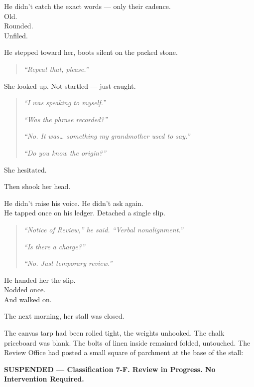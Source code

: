 \documentclass[12pt]{article}
\begin{document}
He didn’t catch the exact words --- only their cadence.\\
Old.\\
Rounded.\\
Unfiled.

\vspace{1em}

He stepped toward her, boots silent on the packed stone.

\begin{quote}
\textit{“Repeat that, please.”}
\end{quote}

She looked up. Not startled --- just caught.

\begin{quote}
\textit{“I was speaking to myself.”}

\textit{“Was the phrase recorded?”}

\textit{“No. It was… something my grandmother used to say.”}

\textit{“Do you know the origin?”}
\end{quote}

She hesitated.

Then shook her head.

He didn’t raise his voice. He didn’t ask again.\\
He tapped once on his ledger. Detached a single slip.

\begin{quote}
\textit{“Notice of Review,” he said. “Verbal nonalignment.”}

\textit{“Is there a charge?”}

\textit{“No. Just temporary review.”}
\end{quote}

He handed her the slip.\\
Nodded once.\\
And walked on.

\vspace{1em}

The next morning, her stall was closed.

The canvas tarp had been rolled tight, the weights unhooked. The chalk priceboard was blank. The bolts of linen inside remained folded, untouched. The Review Office had posted a small square of parchment at the base of the stall:

\begin{center}
\textbf{SUSPENDED --- Classification 7-F. Review in Progress. No Intervention Required.}
\end{center}
\end{document}
